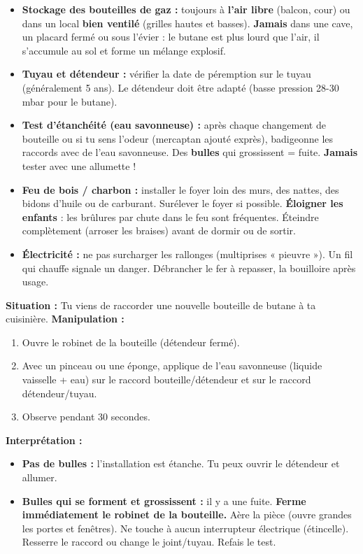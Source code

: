 \documentclass[11pt]{article}
\begin{document}
\begin{itemize}
    \item \textbf{Stockage des bouteilles de gaz :} toujours à \textbf{l'air libre} (balcon, cour) ou dans un local \textbf{bien ventilé} (grilles hautes et basses). \textbf{Jamais} dans une cave, un placard fermé ou sous l'évier : le butane est plus lourd que l'air, il s'accumule au sol et forme un mélange explosif.
    \item \textbf{Tuyau et détendeur :} vérifier la date de péremption sur le tuyau (généralement 5 ans). Le détendeur doit être adapté (basse pression 28-30 mbar pour le butane).
    \item \textbf{Test d'étanchéité (eau savonneuse) :} après chaque changement de bouteille ou si tu sens l'odeur (mercaptan ajouté exprès), badigeonne les raccords avec de l'eau savonneuse. Des \textbf{bulles} qui grossissent = fuite. \textbf{Jamais} tester avec une allumette !
    \item \textbf{Feu de bois / charbon :} installer le foyer loin des murs, des nattes, des bidons d'huile ou de carburant. Surélever le foyer si possible. \textbf{Éloigner les enfants} : les brûlures par chute dans le feu sont fréquentes. Éteindre complètement (arroser les braises) avant de dormir ou de sortir.
    \item \textbf{Électricité :} ne pas surcharger les rallonges (multiprises « pieuvre »). Un fil qui chauffe signale un danger. Débrancher le fer à repasser, la bouilloire après usage.
\end{itemize}

\begin{exemplebox}
\textbf{Situation :} Tu viens de raccorder une nouvelle bouteille de butane à ta cuisinière.
\textbf{Manipulation :}
\begin{enumerate}
    \item Ouvre le robinet de la bouteille (détendeur fermé).
    \item Avec un pinceau ou une éponge, applique de l'eau savonneuse (liquide vaisselle + eau) sur le raccord bouteille/détendeur et sur le raccord détendeur/tuyau.
    \item Observe pendant 30 secondes.
\end{enumerate}
\textbf{Interprétation :}
\begin{itemize}
    \item \textbf{Pas de bulles :} l'installation est étanche. Tu peux ouvrir le détendeur et allumer.
    \item \textbf{Bulles qui se forment et grossissent :} il y a une fuite. \textbf{Ferme immédiatement le robinet de la bouteille.} Aère la pièce (ouvre grandes les portes et fenêtres). Ne touche à aucun interrupteur électrique (étincelle). Resserre le raccord ou change le joint/tuyau. Refais le test.
\end{itemize}
\end{exemplebox}
\end{document}
